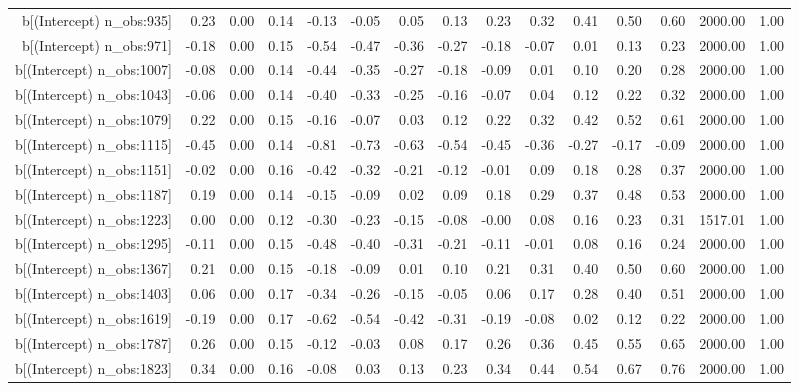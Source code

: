\begin{table}[ht]
\begin{tabular}{rrrrrrrrrrrrrrr}
  b[(Intercept) n\_obs:935] & 0.23 & 0.00 & 0.14 & -0.13 & -0.05 & 0.05 & 0.13 & 0.23 & 0.32 & 0.41 & 0.50 & 0.60 & 2000.00 & 1.00 \\ 
  b[(Intercept) n\_obs:971] & -0.18 & 0.00 & 0.15 & -0.54 & -0.47 & -0.36 & -0.27 & -0.18 & -0.07 & 0.01 & 0.13 & 0.23 & 2000.00 & 1.00 \\ 
  b[(Intercept) n\_obs:1007] & -0.08 & 0.00 & 0.14 & -0.44 & -0.35 & -0.27 & -0.18 & -0.09 & 0.01 & 0.10 & 0.20 & 0.28 & 2000.00 & 1.00 \\ 
  b[(Intercept) n\_obs:1043] & -0.06 & 0.00 & 0.14 & -0.40 & -0.33 & -0.25 & -0.16 & -0.07 & 0.04 & 0.12 & 0.22 & 0.32 & 2000.00 & 1.00 \\ 
  b[(Intercept) n\_obs:1079] & 0.22 & 0.00 & 0.15 & -0.16 & -0.07 & 0.03 & 0.12 & 0.22 & 0.32 & 0.42 & 0.52 & 0.61 & 2000.00 & 1.00 \\ 
  b[(Intercept) n\_obs:1115] & -0.45 & 0.00 & 0.14 & -0.81 & -0.73 & -0.63 & -0.54 & -0.45 & -0.36 & -0.27 & -0.17 & -0.09 & 2000.00 & 1.00 \\ 
  b[(Intercept) n\_obs:1151] & -0.02 & 0.00 & 0.16 & -0.42 & -0.32 & -0.21 & -0.12 & -0.01 & 0.09 & 0.18 & 0.28 & 0.37 & 2000.00 & 1.00 \\ 
  b[(Intercept) n\_obs:1187] & 0.19 & 0.00 & 0.14 & -0.15 & -0.09 & 0.02 & 0.09 & 0.18 & 0.29 & 0.37 & 0.48 & 0.53 & 2000.00 & 1.00 \\ 
  b[(Intercept) n\_obs:1223] & 0.00 & 0.00 & 0.12 & -0.30 & -0.23 & -0.15 & -0.08 & -0.00 & 0.08 & 0.16 & 0.23 & 0.31 & 1517.01 & 1.00 \\ 
  b[(Intercept) n\_obs:1295] & -0.11 & 0.00 & 0.15 & -0.48 & -0.40 & -0.31 & -0.21 & -0.11 & -0.01 & 0.08 & 0.16 & 0.24 & 2000.00 & 1.00 \\ 
  b[(Intercept) n\_obs:1367] & 0.21 & 0.00 & 0.15 & -0.18 & -0.09 & 0.01 & 0.10 & 0.21 & 0.31 & 0.40 & 0.50 & 0.60 & 2000.00 & 1.00 \\ 
  b[(Intercept) n\_obs:1403] & 0.06 & 0.00 & 0.17 & -0.34 & -0.26 & -0.15 & -0.05 & 0.06 & 0.17 & 0.28 & 0.40 & 0.51 & 2000.00 & 1.00 \\ 
  b[(Intercept) n\_obs:1619] & -0.19 & 0.00 & 0.17 & -0.62 & -0.54 & -0.42 & -0.31 & -0.19 & -0.08 & 0.02 & 0.12 & 0.22 & 2000.00 & 1.00 \\ 
  b[(Intercept) n\_obs:1787] & 0.26 & 0.00 & 0.15 & -0.12 & -0.03 & 0.08 & 0.17 & 0.26 & 0.36 & 0.45 & 0.55 & 0.65 & 2000.00 & 1.00 \\ 
  b[(Intercept) n\_obs:1823] & 0.34 & 0.00 & 0.16 & -0.08 & 0.03 & 0.13 & 0.23 & 0.34 & 0.44 & 0.54 & 0.67 & 0.76 & 2000.00 & 1.00 \\ 

\end{tabular}
\end{table}

